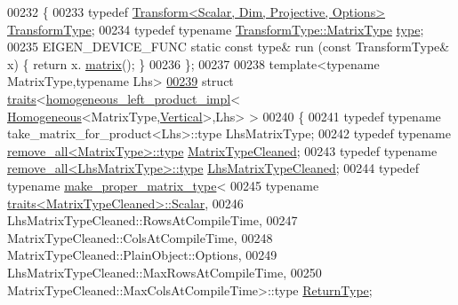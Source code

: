 \begin{DoxyCode}
00232 \{
00233   \textcolor{keyword}{typedef} \hyperlink{group___geometry___module_class_eigen_1_1_transform}{Transform<Scalar, Dim, Projective, Options>} 
      \hyperlink{group___geometry___module_class_eigen_1_1_transform}{TransformType};
00234   \textcolor{keyword}{typedef} \textcolor{keyword}{typename} \hyperlink{group___core___module_class_eigen_1_1_matrix}{TransformType::MatrixType} \hyperlink{group___core___module_class_eigen_1_1_matrix}{type};
00235   EIGEN\_DEVICE\_FUNC \textcolor{keyword}{static} \textcolor{keyword}{const} type& run (\textcolor{keyword}{const} TransformType& x) \{ \textcolor{keywordflow}{return} x.
      \hyperlink{group___geometry___module_aec8168000a88a807130d41020af98d47}{matrix}(); \}
00236 \};
00237 
00238 \textcolor{keyword}{template}<\textcolor{keyword}{typename} MatrixType,\textcolor{keyword}{typename} Lhs>
\hyperlink{struct_eigen_1_1internal_1_1traits_3_01homogeneous__left__product__impl_3_01_homogeneous_3_01_ma5f6080eece96c58f7d2ccea57ec7242b}{00239} \textcolor{keyword}{struct }\hyperlink{struct_eigen_1_1internal_1_1traits}{traits}<\hyperlink{struct_eigen_1_1internal_1_1homogeneous__left__product__impl}{homogeneous\_left\_product\_impl}<
      \hyperlink{group___geometry___module_class_eigen_1_1_homogeneous}{Homogeneous}<MatrixType,\hyperlink{group__enums_ggad49a7b3738e273eb00932271b36127f7addca718e0564723df21d61b94b1198be}{Vertical}>,Lhs> >
00240 \{
00241   \textcolor{keyword}{typedef} \textcolor{keyword}{typename} take\_matrix\_for\_product<Lhs>::type LhsMatrixType;
00242   \textcolor{keyword}{typedef} \textcolor{keyword}{typename} \hyperlink{group___sparse_core___module}{remove\_all<MatrixType>::type} 
      \hyperlink{group___sparse_core___module}{MatrixTypeCleaned};
00243   \textcolor{keyword}{typedef} \textcolor{keyword}{typename} \hyperlink{group___sparse_core___module}{remove\_all<LhsMatrixType>::type} 
      \hyperlink{group___sparse_core___module}{LhsMatrixTypeCleaned};
00244   \textcolor{keyword}{typedef} \textcolor{keyword}{typename} \hyperlink{class_eigen_1_1internal_1_1make__proper__matrix__type}{make\_proper\_matrix\_type}<
00245                  \textcolor{keyword}{typename} \hyperlink{struct_eigen_1_1internal_1_1traits}{traits<MatrixTypeCleaned>::Scalar},
00246                  LhsMatrixTypeCleaned::RowsAtCompileTime,
00247                  MatrixTypeCleaned::ColsAtCompileTime,
00248                  MatrixTypeCleaned::PlainObject::Options,
00249                  LhsMatrixTypeCleaned::MaxRowsAtCompileTime,
00250                  MatrixTypeCleaned::MaxColsAtCompileTime>::type \hyperlink{group___core___module_class_eigen_1_1_matrix}{ReturnType};

\end{DoxyCode}
